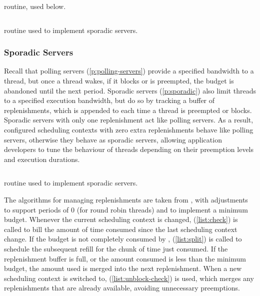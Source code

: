\begin{listing}
\inputminted{c}{code/refill_used.c}
\caption[Schedule used routine.]{ routine, used below.}
\inputminted{c}{code/refill_check.c}
\caption[Check budget routine.]{ routine used to implement sporadic servers.}
\label{list:check}
\end{listing}

\subsubsection{Sporadic Servers}
\label{sec:impl-sporadic}

Recall that polling servers (\cref{p:polling-servers}) provide a specified bandwidth to a thread,
but once a thread wakes, if it blocks or is preempted, the budget is abandoned until the next
period. Sporadic servers (\cref{p:sporadic}) also limit threads to a specified execution bandwidth,
but do so by tracking a buffer of replenishments, which is appended to each time a thread is
preempted or blocks. Sporadic servers with only one replenishment act like polling servers.
As a result, configured scheduling contexts with zero extra replenishments behave like polling servers,
otherwise they behave as sporadic servers,  allowing application developers to
tune the behaviour of threads depending on their preemption levels and execution durations.

\begin{listing}
\inputminted{c}{code/split_check.c}
\caption[Split check routine.]{ routine used to implement sporadic servers.}
\label{list:split}
\end{listing}

The algorithms for managing replenishments are taken from \citet{Danish_LW_11}, with adjustments to
support periods of 0 (for round robin threads) and to implement a minimum budget.  Whenever the
current scheduling context is changed,  (\cref{list:check}) is called to bill the amount of time consumed since the last scheduling
context change. If the budget is not completely consumed by ,
 (\cref{list:split}) is called to schedule the
subsequent refill for the chunk of time just consumed.  If the replenishment buffer is full, or the
amount consumed is less than the minimum budget, the amount used is merged into the next
replenishment.  When a new scheduling context is switched to,  
(\cref{list:unblock-check}) is used, which merges any replenishments that are already available,
avoiding unnecessary preemptions.

